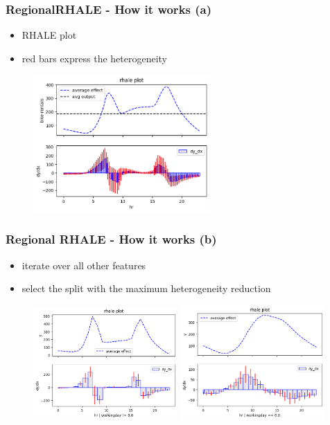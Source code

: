 \documentclass{beamer}
\begin{document}
\begin{frame}
  \frametitle{RegionalRHALE - How it works (a)}
  \begin{itemize}
  \item RHALE plot~\citep{gkolemis2023rhale}
  \item red bars express the heterogeneity
  \end{itemize}
  \begin{figure}[ht]
    \centering
    \includegraphics[width=0.6\textwidth]{./figures/bike_sharing_global_rhale_heterogeneity.png}
  \end{figure}
\end{frame}

\begin{frame}
  \frametitle{Regional RHALE - How it works (b)}
  \begin{itemize}
  \item iterate over all other features
  \item select the split with the maximum heterogeneity reduction
  \end{itemize}
  \begin{figure}[ht]
    \centering
    \includegraphics[width=0.49\textwidth]{./figures/bike_sharing_regional_rhale_workingdays.png}
    \includegraphics[width=0.49\textwidth]{./figures/bike_sharing_regional_rhale_weekends.png}
  \end{figure}
\end{frame}
\end{document}
